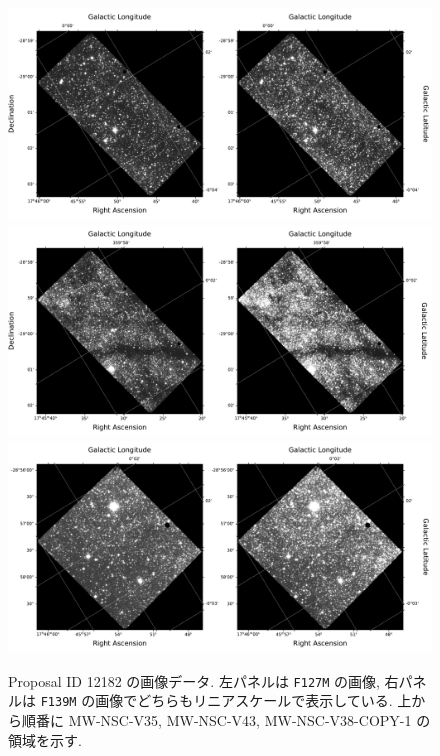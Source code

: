 \documentclass[10pt,a4paper,dvipdfmx,uplatex]{jsarticle}
\begin{document}
\begin{figure}
  \centering
  \includegraphics[width=\linewidth]{img/hst_12182_46_wfc3_ir_f127m_drz.pdf}
  \includegraphics[width=\linewidth]{img/hst_12182_47_wfc3_ir_f127m_drz.pdf}
  \includegraphics[width=\linewidth]{img/hst_12182_48_wfc3_ir_f127m_drz.pdf}
  \caption{Proposal ID 12182 の画像データ. 左パネルは \texttt{F127M} の画像, 右パネルは \texttt{F139M} の画像でどちらもリニアスケールで表示している. 上から順番に MW-NSC-V35, MW-NSC-V43, MW-NSC-V38-COPY-1 の領域を示す.}
  \label{fig:12182a}
\end{figure}
\end{document}
